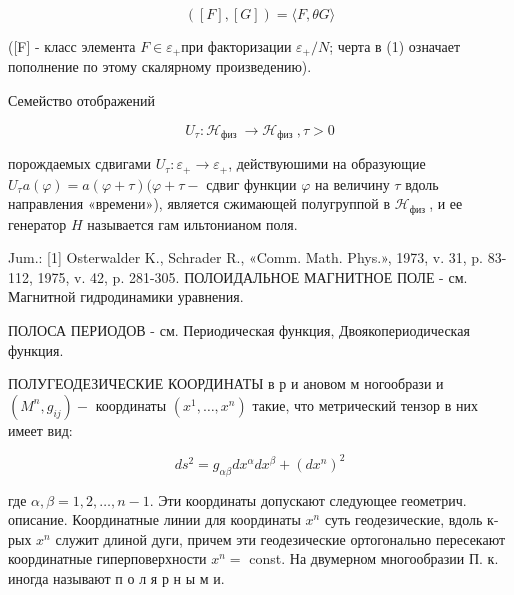 \documentclass[10pt]{article}
\begin{document}
\[

([F],[G])=\langle F, \theta G\rangle

\]



([F] - класс элемента $F \in \varepsilon_{+}$при факторизации $\varepsilon_{+} / N$; черта в (1) означает пополнение по этому скалярному произведению).



Семейство отображений



\[

U_{\tau}: \mathscr{H}_{\text {физ }} \rightarrow \mathscr{H}_{\text {физ }}, \tau>0

\]



порождаемых сдвигами $U_{\tau}: \varepsilon_{+} \rightarrow \varepsilon_{+}$, действуюшими на образующие $U_{\tau} a(\varphi)=a(\varphi+\tau)(\varphi+\tau-$ сдвиг функции $\varphi$ на величину $\tau$ вдоль направления «времени»), является сжимающей полугруппой в $\mathscr{H}_{\text {физ }}$, и ее генератор $H$ называется гам ильтонианом поля.



Jum.: [1] Osterwalder K., Schrader R., «Comm. Math. Phys.», 1973, v. 31, p. 83-112, 1975, v. 42, p. 281-305. ПОЛОИДАЛЬНОЕ МАГНИТНОЕ ПОЛЕ - см. Магнитной гидродинамики уравнения.



ПОЛОСА ПЕРИОДОВ - см. Периодическая функция, Двоякопериодическая функция.



ПОЛУГЕОДЕЗИЧЕСКИЕ КООРДИНАТЫ в р и ановом м ногообрази и $\left(M^{n}, g_{i j}\right)-$ координаты $\left(x^{1}, \ldots, x^{n}\right)$ такие, что метрический тензор в них имеет вид:



\[

d s^{2}=g_{\alpha \beta} d x^{\alpha} d x^{\beta}+\left(d x^{n}\right)^{2}

\]



где $\alpha, \beta=1,2, \ldots, n-1$. Эти координаты допускают следующее геометрич. описание. Координатные линии для координаты $x^{n}$ суть геодезические, вдоль к-рых $x^{n}$ служит длиной дуги, причем эти геодезические ортогонально пересекают координатные гиперповерхности $x^{n}=$ const. На двумерном многообразии П. к. иногда называют п о л я р н ы м и.
\end{document}
